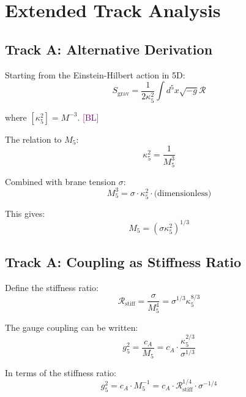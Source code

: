 \documentclass[11pt,a4paper]{article}
\newcommand{\tagBL}{\textcolor{purple}{[BL]}}
\begin{document}
\section{Extended Track Analysis}
\label{app:extended}

\subsection{Track A: Alternative Derivation}

Starting from the Einstein-Hilbert action in 5D:
\begin{equation}
\label{eq:app-eh-5d}
S_{\text{grav}} = \frac{1}{2\kappa_5^2} \int d^5x \sqrt{-g} \mathcal{R}
\end{equation}

where $[\kappa_5^2] = M^{-3}$. \tagBL

The relation to $M_5$:
\begin{equation}
\label{eq:app-kappa-M5}
\kappa_5^2 = \frac{1}{M_5^3}
\end{equation}

Combined with brane tension $\sigma$:
\begin{equation}
\label{eq:app-M5-sigma}
M_5^3 = \sigma \cdot \kappa_5^2 \cdot \text{(dimensionless)}
\end{equation}

This gives:
\begin{equation}
\label{eq:app-M5-explicit}
M_5 = (\sigma \kappa_5^2)^{1/3}
\end{equation}

\subsection{Track A: Coupling as Stiffness Ratio}

Define the stiffness ratio:
\begin{equation}
\label{eq:app-stiff-ratio}
\mathcal{R}_{\text{stiff}} = \frac{\sigma}{M_5^4} = \sigma^{1/3} \kappa_5^{8/3}
\end{equation}

The gauge coupling can be written:
\begin{equation}
\label{eq:app-g5-stiff}
g_5^2 = \frac{c_A}{M_5} = c_A \cdot \frac{\kappa_5^{2/3}}{\sigma^{1/3}}
\end{equation}

In terms of the stiffness ratio:
\begin{equation}
\label{eq:app-g5-R}
g_5^2 = c_A \cdot M_5^{-1} = c_A \cdot \mathcal{R}_{\text{stiff}}^{1/4} \cdot \sigma^{-1/4}
\end{equation}
\end{document}
